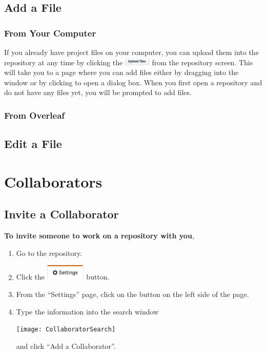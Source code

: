 \documentclass[11pt]{article}
\begin{document}
\subsection{Add a File}

\subsubsection{From Your Computer} 

If you already have project files on your computer, you can upload them into the repository at any time by clicking the \includegraphics[width=0.5in]{UploadFilesbutton} from the repository screen. This will take you to a page where you can add files either by dragging into the window or by clicking to open a dialog box. When you first open a repository and do not have any files yet, you will be prompted to add files. 

\subsubsection{From Overleaf}

\subsection{Edit a File}

\section{Collaborators}

\subsection{Invite a Collaborator} 

\textbf{To invite someone to work on a repository with you},

\begin{enumerate}
\item Go to the repository.
\item Click the \includegraphics[width=0.75in]{SettingsButton} button.  
\item From the ``Settings'' page, click on the  button on the left side of the page.
\item Type the information into the search window \begin{center} 
\texttt{[image: CollaboratorSearch]}
\end{center}
and click ``Add a Collaborator''. 
\end{enumerate}
\end{document}
